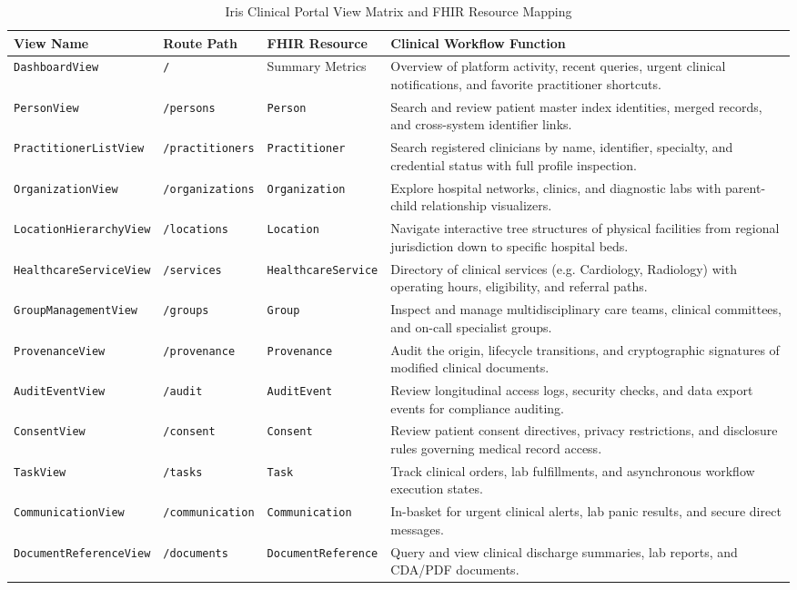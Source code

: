 \begin{table}[htbp]
\centering
\small
\begin{tabularx}{\textwidth}{l l p{3.2cm} X}
\toprule
\textbf{View Name} & \textbf{Route Path} & \textbf{FHIR Resource} & \textbf{Clinical Workflow Function} \\
\midrule
\texttt{DashboardView} & \texttt{/} & Summary Metrics & Overview of platform activity, recent queries, urgent clinical notifications, and favorite practitioner shortcuts. \\
\texttt{PersonView} & \texttt{/persons} & \texttt{Person} & Search and review patient master index identities, merged records, and cross-system identifier links. \\
\texttt{PractitionerListView} & \texttt{/practitioners} & \texttt{Practitioner} & Search registered clinicians by name, identifier, specialty, and credential status with full profile inspection. \\
\texttt{OrganizationView} & \texttt{/organizations} & \texttt{Organization} & Explore hospital networks, clinics, and diagnostic labs with parent-child relationship visualizers. \\
\texttt{LocationHierarchyView} & \texttt{/locations} & \texttt{Location} & Navigate interactive tree structures of physical facilities from regional jurisdiction down to specific hospital beds. \\
\texttt{HealthcareServiceView} & \texttt{/services} & \texttt{HealthcareService} & Directory of clinical services (e.g. Cardiology, Radiology) with operating hours, eligibility, and referral paths. \\
\texttt{GroupManagementView} & \texttt{/groups} & \texttt{Group} & Inspect and manage multidisciplinary care teams, clinical committees, and on-call specialist groups. \\
\texttt{ProvenanceView} & \texttt{/provenance} & \texttt{Provenance} & Audit the origin, lifecycle transitions, and cryptographic signatures of modified clinical documents. \\
\texttt{AuditEventView} & \texttt{/audit} & \texttt{AuditEvent} & Review longitudinal access logs, security checks, and data export events for compliance auditing. \\
\texttt{ConsentView} & \texttt{/consent} & \texttt{Consent} & Review patient consent directives, privacy restrictions, and disclosure rules governing medical record access. \\
\texttt{TaskView} & \texttt{/tasks} & \texttt{Task} & Track clinical orders, lab fulfillments, and asynchronous workflow execution states. \\
\texttt{CommunicationView} & \texttt{/communication} & \texttt{Communication} & In-basket for urgent clinical alerts, lab panic results, and secure direct messages. \\
\texttt{DocumentReferenceView} & \texttt{/documents} & \texttt{DocumentReference} & Query and view clinical discharge summaries, lab reports, and CDA/PDF documents. \\
\bottomrule
\end{tabularx}
\caption{Iris Clinical Portal View Matrix and FHIR Resource Mapping}
\label{tab:clinical_views}
\end{table}

